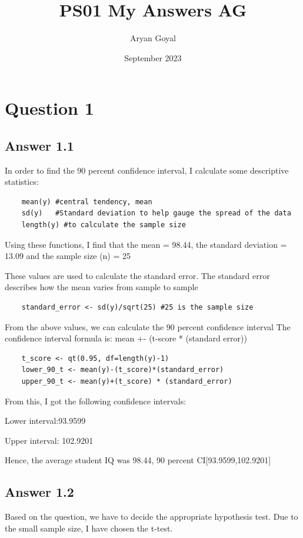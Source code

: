\documentclass{article}
\title{PS01 My Answers AG}
\author{Aryan Goyal}
\date{September 2023}
\begin{document}
\section{Question 1}
    
\subsection{Answer 1.1}
In order to find the 90 percent confidence interval, I calculate some descriptive statistics:
\begin{verbatim}
    mean(y) #central tendency, mean
    sd(y)   #Standard deviation to help gauge the spread of the data
    length(y) #to calculate the sample size
\end{verbatim}

Using these functions, I find that the mean = 98.44, 
the standard deviation = 13.09 and the sample size (n) = 25

\noindent
These values are used to calculate the standard error.
The standard error describes how the mean varies from sample to sample

\begin{verbatim}
    standard_error <- sd(y)/sqrt(25) #25 is the sample size
\end{verbatim}

From the above values, we can calculate the 90 percent confidence interval
The confidence interval formula is: mean +- (t-score * (standard error))
\begin{verbatim}
    t_score <- qt(0.95, df=length(y)-1) 
    lower_90_t <- mean(y)-(t_score)*(standard_error) 
    upper_90_t <- mean(y)+(t_score) * (standard_error)
\end{verbatim}
From this, I got the following confidence intervals:

\begin{center} 
Lower interval:93.9599

Upper interval: 102.9201
\end{center}  
Hence, the average student IQ was 98.44, 90 percent CI[93.9599,102.9201]

\subsection{Answer 1.2}

Based on the question, we have to decide the appropriate hypothesis test.
Due to the small sample size, I have chosen the t-test. 
\vspace{0.3cm}
\end{document}
